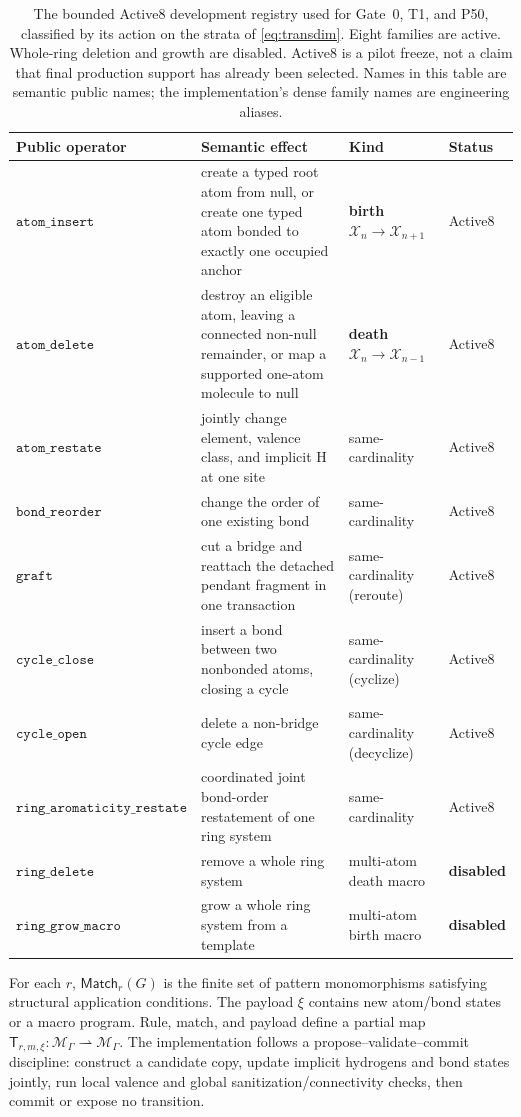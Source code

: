 \documentclass{article}
\newcommand{\M}{\mathcal{M}_{\Gamma}}
\newcommand{\T}{\mathsf{T}}
\newcommand{\Match}{\mathsf{Match}}
\newcommand{\op}[1]{\texttt{#1}}
\newcommand{\X}{\mathcal{X}}
\theoremstyle{definition}
\theoremstyle{remark}
\begin{document}
\begin{table}[tb]
\centering
\caption{The bounded Active8 development registry used for Gate~0, T1, and P50, classified by its action on the strata of \eqref{eq:transdim}. Eight families are active. Whole-ring deletion and growth are disabled. Active8 is a pilot freeze, not a claim that final production support has already been selected. Names in this table are semantic public names; the implementation's dense family names are engineering aliases.}
\label{tab:operators-full}
\small
\begin{tabularx}{\textwidth}{lXll}
\toprule
Public operator & Semantic effect & Kind & Status\\
\midrule
$\op{atom\_insert}$ & create a typed root atom from null, or create one typed atom bonded to exactly one occupied anchor & \textbf{birth} $\X_n\!\to\!\X_{n+1}$ & Active8\\
$\op{atom\_delete}$ & destroy an eligible atom, leaving a connected non-null remainder, or map a supported one-atom molecule to null & \textbf{death} $\X_n\!\to\!\X_{n-1}$ & Active8\\
$\op{atom\_restate}$ & jointly change element, valence class, and implicit H at one site & same-cardinality & Active8\\
$\op{bond\_reorder}$ & change the order of one existing bond & same-cardinality & Active8\\
$\op{graft}$ & cut a bridge and reattach the detached pendant fragment in one transaction & same-cardinality (reroute) & Active8\\
$\op{cycle\_close}$ & insert a bond between two nonbonded atoms, closing a cycle & same-cardinality (cyclize) & Active8\\
$\op{cycle\_open}$ & delete a non-bridge cycle edge & same-cardinality (decyclize) & Active8\\
$\op{ring\_aromaticity\_restate}$ & coordinated joint bond-order restatement of one ring system & same-cardinality & Active8\\
\midrule
$\op{ring\_delete}$ & remove a whole ring system & multi-atom death macro & \textbf{disabled}\\
$\op{ring\_grow\_macro}$ & grow a whole ring system from a template & multi-atom birth macro & \textbf{disabled}\\
\bottomrule
\end{tabularx}
\end{table}

For each $r$, $\Match_r(G)$ is the finite set of pattern monomorphisms satisfying structural application conditions. The payload $\xi$ contains new atom/bond states or a macro program. Rule, match, and payload define a partial map $\T_{r,m,\xi}:\M\rightharpoonup\M$. The implementation follows a propose--validate--commit discipline: construct a candidate copy, update implicit hydrogens and bond states jointly, run local valence and global sanitization/connectivity checks, then commit or expose no transition.
\end{document}
